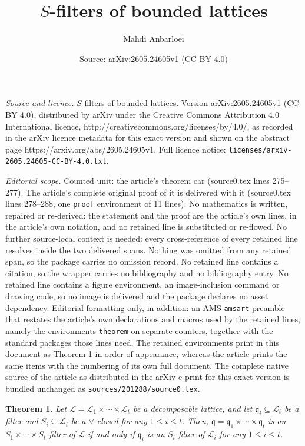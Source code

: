 \documentclass[10pt,a4paper]{amsart}
\title{$S$-filters of bounded lattices}
\author{Mahdi Anbarloei}
\date{Source: arXiv:2605.24605v1 (CC BY 4.0)}
\newtheorem{theorem}{Theorem}
\begin{document}
\maketitle

\noindent\emph{Source and licence.} $S$-filters of bounded lattices. Version arXiv:2605.24605v1 (CC BY 4.0), distributed by arXiv under the Creative Commons Attribution 4.0 International licence, http://creativecommons.org/licenses/by/4.0/, as recorded in the arXiv licence metadata for this exact version and shown on the abstract page https://arxiv.org/abs/2605.24605v1. Full licence notice: \texttt{licenses/arxiv-2605.24605-CC-BY-4.0.txt}.\par\smallskip

\noindent\textit{Editorial scope.} Counted unit: the article's theorem car (source0.tex lines 275--277). The article's complete original proof of it is delivered with it (source0.tex lines 278--288, one \texttt{proof} environment of 11 lines). No mathematics is written, repaired or re-derived: the statement and the proof are the article's own lines, in the article's own notation, and no retained line is substituted or re-flowed.  No further source-local context is needed: every cross-reference of every retained line resolves inside the two delivered spans.  Nothing was omitted from any retained span, so the package carries no omission record.  No retained line contains a citation, so the wrapper carries no bibliography and no bibliography entry.  No retained line contains a figure environment, an image-inclusion command or drawing code, so no image is delivered and the package declares no asset dependency.  Editorial formatting only, in addition: an AMS \texttt{amsart} preamble that restates the article's own declarations and macros used by the retained lines, namely the environments \texttt{theorem} on separate counters, together with the standard packages those lines need.  The retained environments print in this document as Theorem 1 in order of appearance, whereas the article prints the same items with the numbering of its own full document.  The complete native source of the article as distributed in the arXiv e-print for this exact version is bundled unchanged as \texttt{sources/201288/source0.tex}.
\begin{theorem} \label{car}
Let $\mathscr{L}=\mathscr{L}_1 \times \cdots \times \mathscr{L}_t$ be a decomposable lattice, and let $\mathfrak{q}_i \subseteq \mathscr{L}_i$ be a filter and $S_i \subseteq \mathscr{L}_i$ be a $\vee$-closed for any $1 \le i \le t$. Then, $\mathfrak{q}= \mathfrak{q}_1 \times \cdots \times  \mathfrak{q}_t$ is an $S_1 \times \cdots \times S_t$-filter of $\mathscr{L}$ if and only if $\mathfrak{q}_i$ is an $S_i$-filter of $\mathscr{L}_i$ for any $1 \le i \le t$.
\end{theorem}
\end{document}
